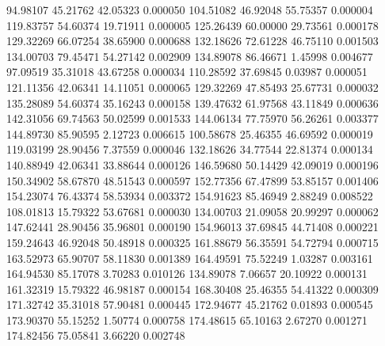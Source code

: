       94.98107       45.21762       42.05323       0.000050
      104.51082       46.92048       55.75357       0.000004
      119.83757       54.60374       19.71911       0.000005
      125.26439       60.00000       29.73561       0.000178
      129.32269       66.07254       38.65900       0.000688
      132.18626       72.61228       46.75110       0.001503
      134.00703       79.45471       54.27142       0.002909
      134.89078       86.46671        1.45998       0.004677
       97.09519       35.31018       43.67258       0.000034
      110.28592       37.69845        0.03987       0.000051
      121.11356       42.06341       14.11051       0.000065
      129.32269       47.85493       25.67731       0.000032
      135.28089       54.60374       35.16243       0.000158
      139.47632       61.97568       43.11849       0.000636
      142.31056       69.74563       50.02599       0.001533
      144.06134       77.75970       56.26261       0.003377
      144.89730       85.90595        2.12723       0.006615
      100.58678       25.46355       46.69592       0.000019
      119.03199       28.90456        7.37559       0.000046
      132.18626       34.77544       22.81374       0.000134
      140.88949       42.06341       33.88644       0.000126
      146.59680       50.14429       42.09019       0.000196
      150.34902       58.67870       48.51543       0.000597
      152.77356       67.47899       53.85157       0.001406
      154.23074       76.43374       58.53934       0.003372
      154.91623       85.46949        2.88249       0.008522
      108.01813       15.79322       53.67681       0.000030
      134.00703       21.09058       20.99297       0.000062
      147.62441       28.90456       35.96801       0.000190
      154.96013       37.69845       44.71408       0.000221
      159.24643       46.92048       50.48918       0.000325
      161.88679       56.35591       54.72794       0.000715
      163.52973       65.90707       58.11830       0.001389
      164.49591       75.52249        1.03287       0.003161
      164.94530       85.17078        3.70283       0.010126
      134.89078        7.06657       20.10922       0.000131
      161.32319       15.79322       46.98187       0.000154
      168.30408       25.46355       54.41322       0.000309
      171.32742       35.31018       57.90481       0.000445
      172.94677       45.21762        0.01893       0.000545
      173.90370       55.15252        1.50774       0.000758
      174.48615       65.10163        2.67270       0.001271
      174.82456       75.05841        3.66220       0.002748
